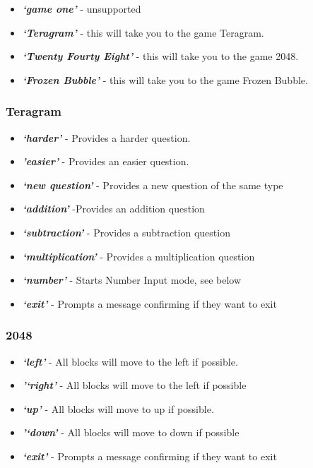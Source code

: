 \documentclass[11pt, oneside]{article}
\begin{document}
\begin{itemize}
  \item {\em\bf`game one'} - unsupported
  \item {\em\bf`Teragram'}  - this will take you to the game Teragram.
  \item {\em\bf`Twenty Fourty Eight'} - this will take you to the game 2048.
  \item {\em\bf`Frozen Bubble'} - this will take you to the game Frozen Bubble.
\end{itemize}

\subsubsection*{Teragram}

\begin{itemize}
  \item {\em\bf`harder'} - Provides a harder question. 
  \item {\em\bf'easier'} - Provides an easier question.
  \item {\em\bf`new question'} - Provides a new question of the same type
  \item {\em\bf`addition'} -Provides an addition question
  \item {\em\bf`subtraction'} - Provides a subtraction question
  \item {\em\bf`multiplication'} - Provides a multiplication question 
  \item {\em\bf`number'} - Starts Number Input mode, see below
  \item {\em\bf`exit'} - Prompts a message confirming if they want to exit
 
\end{itemize}

\subsubsection*{2048}

\begin{itemize}
	\item {\em\bf`left'} - All blocks will move to the left if possible. 
	\item {\em\bf'`right'} - All blocks will move to the left if possible
	\item {\em\bf`up'} - All blocks will move to up if possible. 
	\item {\em\bf'`down'} - All blocks will move to down if possible
	\item {\em\bf`exit'} - Prompts a message confirming if they want to exit
	
\end{itemize}
\end{document}
